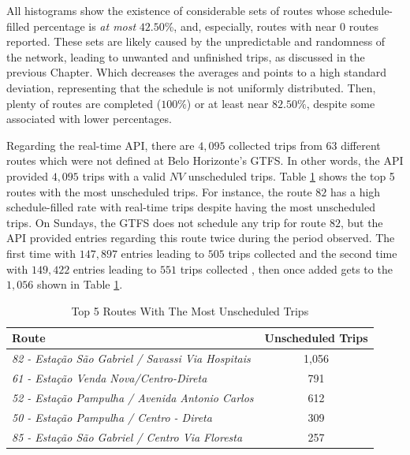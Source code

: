 All histograms show the existence of considerable sets of routes whose schedule-filled percentage is {\em at most} $42.50$\%, and, especially, routes with near 0 routes reported. These sets are 
likely caused by the unpredictable and randomness of the network, leading to unwanted and unfinished trips, as discussed in the previous Chapter. Which decreases the averages and points to a high standard deviation, representing that the schedule is not uniformly distributed. Then, plenty of routes are completed ($100\%$) or at least near $82.50\%$, despite some associated with lower percentages.


Regarding the real-time API, there are $4,095$ collected trips from $63$ different routes which were not defined at Belo 
Horizonte's GTFS. In other words, the API provided $4,095$ trips with a valid $NV$ unscheduled 
trips. Table \ref{tab:unscheduledTrips} shows the top 5 routes with the most unscheduled trips. 
For instance, the route $82$ has a high schedule-filled rate  with real-time trips despite having the most
unscheduled trips. On Sundays, the GTFS does not schedule any trip for route $82$,
but the API provided 
entries regarding this route twice during the period observed.
The first time with $147,897$ entries leading to $505$ trips collected 
and the second time with $149,422$ entries leading to $551$ trips collected , then once added gets to the $1,056$ shown in Table \ref{tab:unscheduledTrips}.

\begin{table}[h]
\centering
\caption{Top 5 Routes With The Most Unscheduled Trips} 
\begin{tabular}{|l|c|}
\hline
Route & Unscheduled Trips  \\ \hline
\textit{82 - Estação São Gabriel / Savassi Via Hospitais} & 1,056 \\ \hline
\textit{61 - Estação Venda Nova/Centro-Direta} & 791 \\ \hline
\textit{52 - Estação Pampulha / Avenida Antonio Carlos} & 612 \\ \hline
\textit{50 - Estação Pampulha / Centro - Direta} & 309 \\ \hline
\textit{85 - Estação São Gabriel / Centro Via Floresta} & 257 \\ \hline
\end{tabular}
\label{tab:unscheduledTrips}
\end{table}



